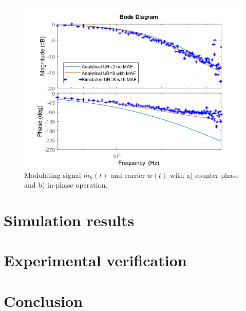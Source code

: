\documentclass[journal]{IEEEtran}
\begin{document}
\begin{figure}[t!]
    \centerline{\includegraphics[width=0.95\linewidth]{figures/nas_clfra.png}}
    \caption{Modulating signal $m_h(t)$ and carrier $w(t)$ with a) counter-phase and b) in-phase operation.}
    \label{fig:InCounterPhase}
\end{figure}



\section{Simulation results}

\section{Experimental verification}

\section{Conclusion}


\ifCLASSOPTIONcaptionsoff
  \newpage
\fi



\end{document}
